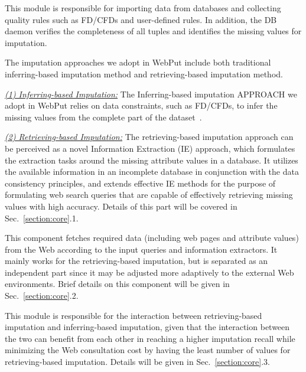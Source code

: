 \documentclass[sigconf]{acmart}
\begin{document}
 This module is responsible for importing data from databases and collecting quality rules such as FD/CFDs and user-defined rules. In addition, the DB daemon verifies the completeness of all tuples and identifies the missing values for imputation.


 The imputation approaches we adopt in WebPut include both traditional inferring-based imputation method and retrieving-based imputation method.

\noindent\underline{\it (1) Inferring-based Imputation:}
The Inferring-based imputation APPROACH we adopt in WebPut relies on data constraints, such as FD/CFDs, to infer the missing values from the complete part of the dataset~\cite{kolahi2009approximating, fan2008conditional}.


\noindent\underline{\it (2) Retrieving-based Imputation:}
The retrieving-based imputation approach can be perceived as a novel Information Extraction (IE) approach, which formulates the extraction tasks around the missing attribute values in a database. It utilizes the available information in an incomplete database in conjunction with the data consistency principles, and extends effective IE methods for the purpose of formulating web search queries that are capable of effectively retrieving missing values with high accuracy. Details of this part will be covered in Sec.~\ref{section:core}.1.

This component fetches required data (including web pages and attribute values) from the Web according to the input queries and information extractors. It mainly works for the retrieving-based imputation, but is separated as an independent part since it may be adjusted more adaptively to the external Web environments. Brief details on this component will be given in Sec.~\ref{section:core}.2.


 This module is responsible for the interaction between retrieving-based imputation and inferring-based imputation, given that the interaction between the two can benefit from each other in reaching a higher imputation recall while minimizing the Web consultation cost by having the least number of values for retrieving-based imputation. Details will be given in Sec.~\ref{section:core}.3.
%
%
%
\end{document}
